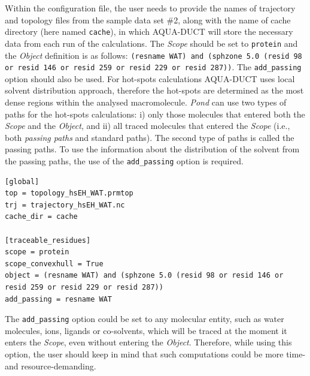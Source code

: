 \documentclass[9pt,tutorial]{livecoms}
\begin{document}
Within the configuration file, the user needs to provide the names of trajectory and topology files from the sample data set \#2, along with the name of cache directory (here named \texttt{cache}), in which AQUA-DUCT will store the necessary data from each run of the calculations. The \emph{Scope} should be set to \texttt{protein} and the \emph{Object} definition is as follows: \texttt{(resname WAT) and (sphzone 5.0 (resid 98 or resid 146 or resid 259 or resid 229 or resid 287))}. The \texttt{add\_passing} option should also be used. For hot-spots calculations AQUA-DUCT uses local solvent distribution approach, therefore the hot-spots are determined as the most dense regions within the analysed macromolecule. \textit{Pond} can use two types of paths for the hot-spots calculations: i) only those molecules that entered both the \textit{Scope} and the \textit{Object}, and ii) all traced molecules that entered the \textit{Scope} (i.e., both \textit{passing paths} and standard paths). The second type of paths is called the passing paths. To use the information about the distribution of the solvent from the passing paths, the use of the \texttt{add\_passing} option is required.
\begin{lstlisting}[columns=fullflexible]
[global]
top = topology_hsEH_WAT.prmtop
trj = trajectory_hsEH_WAT.nc
cache_dir = cache

[traceable_residues]
scope = protein
scope_convexhull = True
object = (resname WAT) and (sphzone 5.0 (resid 98 or resid 146 or resid 259 or resid 229 or resid 287))
add_passing = resname WAT
\end{lstlisting}
The \texttt{add\_passing} option could be set to any molecular entity, such as water molecules, ions, ligands or co-solvents, which will be traced at the moment it enters the \emph{Scope}, even without entering the \emph{Object}. Therefore, while using this option, the user should keep in mind that such computations could be more time- and resource-demanding.
\end{document}
